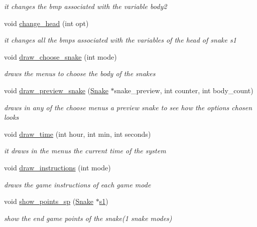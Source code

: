 \begin{DoxyCompactItemize}
\begin{DoxyCompactList}\small\item\em it changes the bmp associated with the variable body2 \end{DoxyCompactList}\item 
void \hyperlink{group__menu_ga0c2bebb094507763ab9c3343f554c0cc}{change\+\_\+head} (int opt)
\begin{DoxyCompactList}\small\item\em it changes all the bmps associated with the variables of the head of snake s1 \end{DoxyCompactList}\item 
void \hyperlink{group__menu_gafebc2d04c898f861176790d50232e001}{draw\+\_\+choose\+\_\+snake} (int mode)
\begin{DoxyCompactList}\small\item\em draws the menus to choose the body of the snakes \end{DoxyCompactList}\item 
void \hyperlink{group__menu_ga75fa9eba2da71d7eafa82e469cf35053}{draw\+\_\+preview\+\_\+snake} (\hyperlink{structSnake}{Snake} $\ast$snake\+\_\+preview, int counter, int body\+\_\+count)
\begin{DoxyCompactList}\small\item\em draws in any of the choose menus a preview snake to see how the options chosen looks \end{DoxyCompactList}\item 
void \hyperlink{group__menu_ga9b565fa7246d14c851c7d66b487e21fc}{draw\+\_\+time} (int hour, int min, int seconds)
\begin{DoxyCompactList}\small\item\em it draws in the menus the current time of the system \end{DoxyCompactList}\item 
void \hyperlink{group__menu_ga4a36c7e8b7af7e8f586a739cd54b85b4}{draw\+\_\+instructions} (int mode)
\begin{DoxyCompactList}\small\item\em draws the game instructions of each game mode \end{DoxyCompactList}\item 
void \hyperlink{group__menu_ga2cb72366439253e4818c96e350f195d2}{show\+\_\+points\+\_\+sp} (\hyperlink{structSnake}{Snake} $\ast$\hyperlink{group__man__events_gaf79c0d77b0cca9ebf96bbbed1f88aed0}{s1})
\begin{DoxyCompactList}\small\item\em show the end game points of the snake(1 snake modes) \end{DoxyCompactList}\item 

\end{DoxyCompactItemize}
